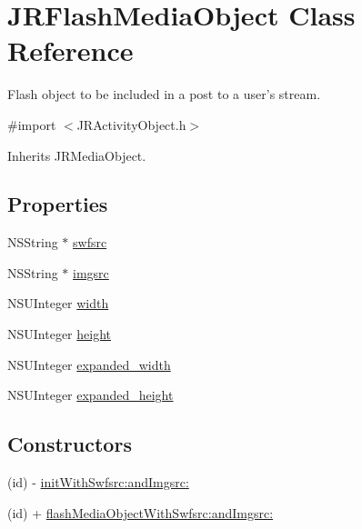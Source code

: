 \hypertarget{interface_j_r_flash_media_object}{
\section{JRFlashMediaObject Class Reference}
\label{interface_j_r_flash_media_object}
}


Flash object to be included in a post to a user's stream.  




{\ttfamily \#import $<$JRActivityObject.h$>$}



Inherits JRMediaObject.

\subsection*{Properties}
\begin{DoxyCompactItemize}
\item 
NSString $\ast$ \hyperlink{interface_j_r_flash_media_object_a5a79b3d8071ac0286b3ee60e9e0138d0}{swfsrc}
\item 
NSString $\ast$ \hyperlink{interface_j_r_flash_media_object_a5a26cacd216012b37900445a8161ac56}{imgsrc}
\item 
NSUInteger \hyperlink{interface_j_r_flash_media_object_aaeb77e697438b7aa6e44f52bea0ed9c2}{width}
\item 
NSUInteger \hyperlink{interface_j_r_flash_media_object_a0689e19fdf6cb9d3911878a95d6ebcc9}{height}
\item 
NSUInteger \hyperlink{interface_j_r_flash_media_object_a9c380d0410afa60d99442f4ab84b517c}{expanded\_\-width}
\item 
NSUInteger \hyperlink{interface_j_r_flash_media_object_ae390a89405d768f2fcc63c24a8271503}{expanded\_\-height}
\end{DoxyCompactItemize}
\subsection*{Constructors}
\label{_amgrp559a25fdb98a7d1fd1c3771ac568d5e9}
 \begin{DoxyCompactItemize}
\item 
(id) -\/ \hyperlink{interface_j_r_flash_media_object_aed4ac7b682373f36379eb81dea041513}{initWithSwfsrc:andImgsrc:}
\item 
(id) + \hyperlink{interface_j_r_flash_media_object_ab7f138fd781dd5cf40f1fc3d96b68edf}{flashMediaObjectWithSwfsrc:andImgsrc:}
\end{DoxyCompactItemize}


